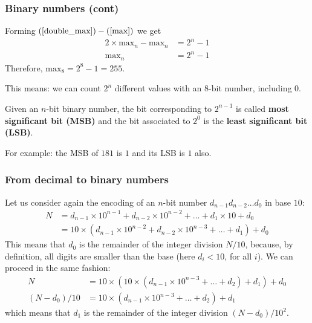 % 
\begin{frame}
\frametitle{Binary numbers (cont)}
\label{max_bin}

Forming \((\ref{double_max}) - (\ref{max})\) we get
\begin{align*}
2 \times \text{max}_n - \text{max}_n &= 2^{n} - 1\\
\text{max}_n &= 2^{n} - 1
\end{align*}
Therefore,
\(
\text{max}_8 = 2^{8} - 1 = 255
\).

\bigskip

This means: we can count \(2^n\) different values with an \(8\)-bit
number, including \(0\).

\bigskip

Given an \(n\)-bit binary number, the bit corresponding to \(2^{n-1}\)
is called \textbf{most significant bit (MSB)} and the bit associated
to \(2^0\) is the \textbf{least significant bit (LSB)}.

\bigskip

For example: the MSB of \(181\) is \(1\) and its LSB is \(1\) also.

\end{frame}

% 
\begin{frame}
\frametitle{From decimal to binary numbers}

Let us consider again the encoding of an \(n\)-bit number
\(d_{n-1}d_{n-2}\dots{d_0}\) in base \(10\):
\begin{align*}
N &= d_{n-1} \times 10^{n-1} + d_{n-2} \times 10^{n-2} + \dots + d_1 \times
10 + d_0\\
  &= 10 \times (d_{n-1} \times 10^{n-2} + d_{n-2} \times 10^{n-3} +
\dots + d_1) + d_0
\end{align*}
This means that \(d_0\) is the remainder of the integer division
\(N/10\), because, by definition, all digits are smaller than the
base (here \(d_i < 10\), for all \(i\)). We can proceed in the same
fashion:
\begin{align*}
N &= 10 \times (10 \times (d_{n-1} \times 10^{n-3} + \dots + d_2) +
d_1) + d_0\\
(N-d_0) / 10 &= 10 \times (d_{n-1} \times 10^{n-3} + \dots + d_2) +
d_1
\end{align*}
which means that \(d_1\) is the remainder of the integer division
\((N - d_0)/10^{2}\).

\end{frame}


